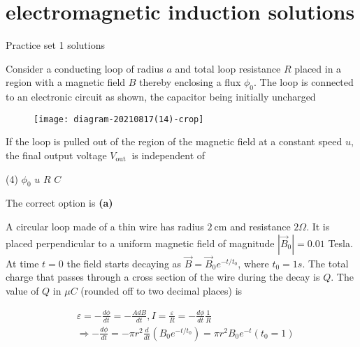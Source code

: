 \chapter{electromagnetic induction solutions}
\begin{abox}
	Practice set 1 solutions
	\end{abox}
\begin{enumerate}
\begin{minipage}{\textwidth}
	\item Consider a conducting loop of radius $a$ and total loop resistance $R$ placed in a region with a magnetic field $B$ thereby enclosing a flux $\phi_{0}$. The loop is connected to an electronic circuit as shown, the capacitor being initially uncharged\\
	\begin{figure}[H]
		\centering
		\texttt{[image: diagram-20210817(14)-crop]}
	\end{figure}
	If the loop is pulled out of the region of the magnetic field at a constant speed $u$, the final output voltage $V_{\text {out }}$ is independent of
\end{minipage}
\begin{tasks}(4)
	\task[\textbf{A.}] $\phi_{0}$
	\task[\textbf{B.}]$u$ 
	\task[\textbf{C.}]$R$
	\task[\textbf{D.}] $C$ 
\end{tasks}
\begin{answer}
	The correct option is \textbf{(a)}	
\end{answer}
\begin{minipage}{\textwidth}
	\item A circular loop made of a thin wire has radius $2 \mathrm{~cm}$ and resistance $2 \Omega$. It is placed perpendicular to a uniform magnetic field of magnitude $\left|\vec{B}_{0}\right|=0.01$ Tesla. At time $t=0$ the field starts decaying as $\vec{B}=\vec{B}_{0} e^{-t / t_{0}}$, where $t_{0}=1 s .$ The total charge that passes through a cross section of the wire during the decay is $Q$. The value of $Q$ in $\mu C$ (rounded off to two decimal places) is
\end{minipage}
\begin{answer}
	\begin{align*}
	& \varepsilon=-\frac{d \phi}{d t}=-\frac{A d B}{d t}, I=\frac{\varepsilon}{R}=-\frac{d \phi}{d t} \frac{1}{R} \\
	&\Rightarrow-\frac{d \phi}{d t}=-\pi r^{2} \frac{d}{d t}\left(B_{0} e^{-t / t_{0}}\right)=\pi r^{2} B_{0} e^{-t}\left(t_{0}=1\right) \\

\end{align*}
\end{answer}
\end{enumerate}
